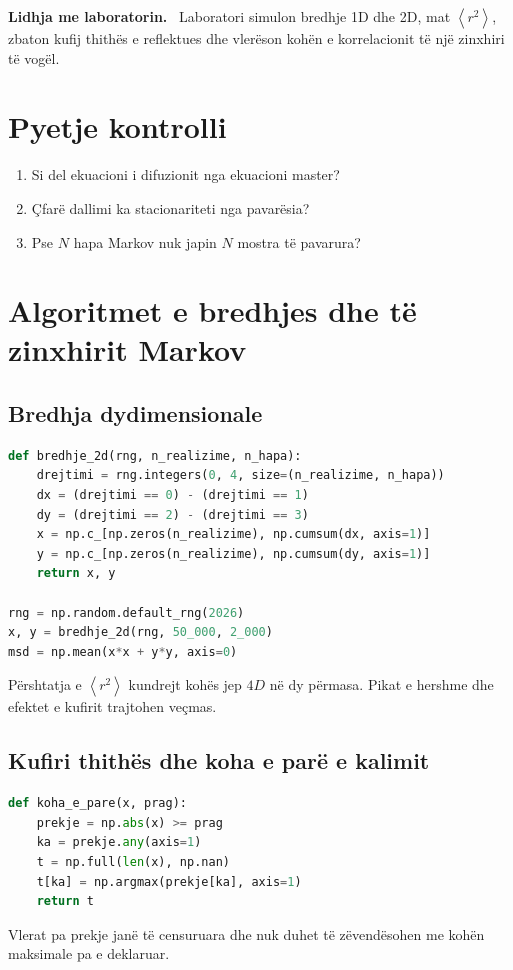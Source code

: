 \documentclass[11pt,oneside,openany]{book}
\newcommand{\avg}[1]{\left\langle #1\right\rangle}
\newenvironment{lidhje}{\par\medskip\noindent\textbf{Lidhja me laboratorin.}\ }{\par\medskip}
\begin{document}
\begin{lidhje}
Laboratori simulon bredhje 1D dhe 2D, mat $\avg{r^2}$, zbaton kufij thithës e reflektues dhe vlerëson kohën e korrelacionit të një zinxhiri të vogël.
\end{lidhje}

\section*{Pyetje kontrolli}
\begin{enumerate}
\item Si del ekuacioni i difuzionit nga ekuacioni master?
\item Çfarë dallimi ka stacionariteti nga pavarësia?
\item Pse $N$ hapa Markov nuk japin $N$ mostra të pavarura?
\end{enumerate}

\section{Algoritmet e bredhjes dhe të zinxhirit Markov}
\subsection{Bredhja dydimensionale}
\begin{lstlisting}[language=Python,caption={Shumë realizime të bredhjes në 2D.}]
def bredhje_2d(rng, n_realizime, n_hapa):
    drejtimi = rng.integers(0, 4, size=(n_realizime, n_hapa))
    dx = (drejtimi == 0) - (drejtimi == 1)
    dy = (drejtimi == 2) - (drejtimi == 3)
    x = np.c_[np.zeros(n_realizime), np.cumsum(dx, axis=1)]
    y = np.c_[np.zeros(n_realizime), np.cumsum(dy, axis=1)]
    return x, y

rng = np.random.default_rng(2026)
x, y = bredhje_2d(rng, 50_000, 2_000)
msd = np.mean(x*x + y*y, axis=0)
\end{lstlisting}
Përshtatja e $\avg{r^2}$ kundrejt kohës jep $4D$ në dy përmasa. Pikat e hershme dhe efektet e kufirit trajtohen veçmas.

\subsection{Kufiri thithës dhe koha e parë e kalimit}
\begin{lstlisting}[language=Python]
def koha_e_pare(x, prag):
    prekje = np.abs(x) >= prag
    ka = prekje.any(axis=1)
    t = np.full(len(x), np.nan)
    t[ka] = np.argmax(prekje[ka], axis=1)
    return t
\end{lstlisting}
Vlerat pa prekje janë të censuruara dhe nuk duhet të zëvendësohen me kohën maksimale pa e deklaruar.
\end{document}
